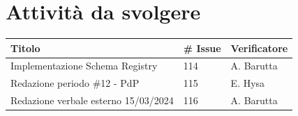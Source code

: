 \documentclass{article}
\begin{document}
\section{Attività da svolgere}
\begin{center}
    \begin{tabular}{|C{7cm}|C{1,5cm}|C{3cm}|}
        \hline
        \textbf{Titolo} & \textbf{\# Issue} & \textbf{Verificatore} \\
        \hline
        \hline
        Implementazione Schema Registry & 114 & A. Barutta \\
        \hline
        Redazione periodo \#12 - PdP & 115 & E. Hysa \\
        \hline
        Redazione verbale esterno 15/03/2024 & 116 & A. Barutta \\
        \hline
    \end{tabular}
\end{center}
\end{document}
